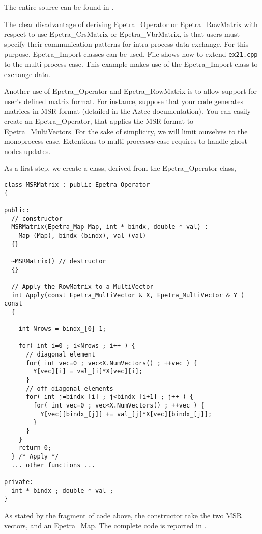 The entire source can be found in
. 

\begin{remark}
  The clear disadvantage of deriving Epetra\_Operator or
  Epetra\_RowMatrix with respect to use Epetra\_CrsMatrix or
  Epetra\_VbrMatrix, is that users must specify their communication
  patterns for intra-process data exchange. For this purpose,
  Epetra\_Import classes can be used.  File 
  shows how to extend \verb!ex21.cpp! to the multi-process case. This
  example makes use of the Epetra\_Import class to exchange data.
\end{remark}


Another use of  Epetra\_Operator and Epetra\_RowMatrix is to allow
support for user's defined matrix format. For instance, suppose that
your code generates matrices in MSR format (detailed in the Aztec
documentation). You can easily create an Epetra\_Operator, that applies
the MSR format to Epetra\_MultiVectors. For the sake of simplicity, we
will limit ourselves to the monoprocess case. Extentions to
multi-processes case requires to handle ghost-nodes updates.

As a first step, we create a class, derived from the Epetra\_Operator
class,
\begin{verbatim}
class MSRMatrix : public Epetra_Operator 
{

public:
  // constructor
  MSRMatrix(Epetra_Map Map, int * bindx, double * val) :
    Map_(Map), bindx_(bindx), val_(val) 
  {}

  ~MSRMatrix() // destructor
  {}

  // Apply the RowMatrix to a MultiVector
  int Apply(const Epetra_MultiVector & X, Epetra_MultiVector & Y ) const 
  {

    int Nrows = bindx_[0]-1;
    
    for( int i=0 ; i<Nrows ; i++ ) {
      // diagonal element
      for( int vec=0 ; vec<X.NumVectors() ; ++vec ) {
        Y[vec][i] = val_[i]*X[vec][i];
      }
      // off-diagonal elements
      for( int j=bindx_[i] ; j<bindx_[i+1] ; j++ ) {
        for( int vec=0 ; vec<X.NumVectors() ; ++vec ) {
          Y[vec][bindx_[j]] += val_[j]*X[vec][bindx_[j]];
        }
      }
    }
    return 0;
  } /* Apply */
  ... other functions ...

private:
  int * bindx_; double * val_;
}
\end{verbatim}
As stated by the fragment of code above, the constructor take the two
MSR vectors, and an Epetra\_Map. The complete code is reported in
.

